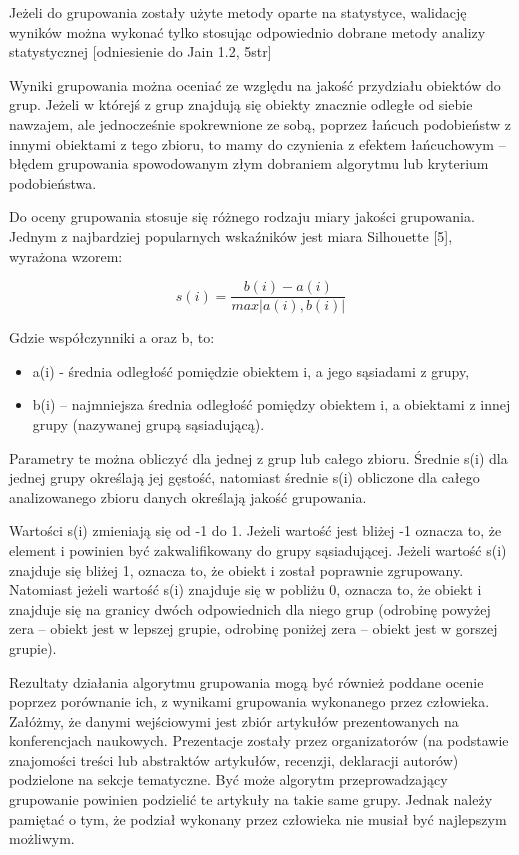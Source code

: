 \documentclass{article}
\begin{document}
Jeżeli do grupowania zostały użyte metody oparte na statystyce, walidację wyników można wykonać tylko stosując odpowiednio dobrane metody analizy statystycznej [odniesienie do Jain 1.2, 5str]

Wyniki grupowania można oceniać ze względu na jakość przydziału obiektów do grup. Jeżeli w którejś z grup znajdują się obiekty znacznie odległe od siebie nawzajem, ale jednocześnie spokrewnione ze sobą, poprzez łańcuch podobieństw z innymi obiektami z tego zbioru, to mamy do czynienia z efektem łańcuchowym – błędem grupowania spowodowanym złym dobraniem algorytmu lub kryterium podobieństwa.

Do oceny grupowania stosuje się różnego rodzaju miary jakości grupowania. Jednym z najbardziej popularnych wskaźników jest miara Silhouette [5], wyrażona wzorem:

\[s(i) = \frac{b(i) - a(i)}{max|a(i),b(i)|}\]

Gdzie współczynniki a oraz b, to:

\begin{itemize}
	\item a(i) - średnia odległość pomiędzie obiektem i, a jego sąsiadami z grupy,
	\item b(i) – najmniejsza średnia odległość pomiędzy obiektem i, a obiektami z innej grupy (nazywanej grupą sąsiadującą).
\end{itemize}
Parametry te można obliczyć dla jednej z grup lub całego zbioru. Średnie s(i)  dla jednej grupy określają jej gęstość, natomiast średnie s(i) obliczone dla całego analizowanego zbioru danych określają jakość grupowania.

Wartości s(i) zmieniają się od -1 do 1. Jeżeli wartość jest bliżej -1 oznacza to, że element i powinien być zakwalifikowany do grupy sąsiadującej. Jeżeli wartość s(i) znajduje się bliżej 1, oznacza to, że obiekt i został poprawnie zgrupowany. Natomiast jeżeli wartość s(i) znajduje się w pobliżu  0, oznacza to, że obiekt i znajduje się na granicy dwóch odpowiednich dla niego grup (odrobinę powyżej zera – obiekt jest w lepszej grupie, odrobinę poniżej zera – obiekt jest w gorszej grupie).

Rezultaty działania algorytmu grupowania mogą być również poddane ocenie poprzez porównanie ich, z wynikami grupowania wykonanego przez człowieka. Załóżmy, że danymi wejściowymi jest zbiór artykułów prezentowanych na konferencjach naukowych. Prezentacje zostały przez organizatorów (na podstawie znajomości treści lub abstraktów artykułów, recenzji, deklaracji autorów) podzielone na sekcje tematyczne. Być może algorytm przeprowadzający grupowanie powinien podzielić te artykuły na takie same grupy. Jednak należy pamiętać o tym, że podział wykonany przez człowieka nie musiał być najlepszym możliwym. 
\end{document}
